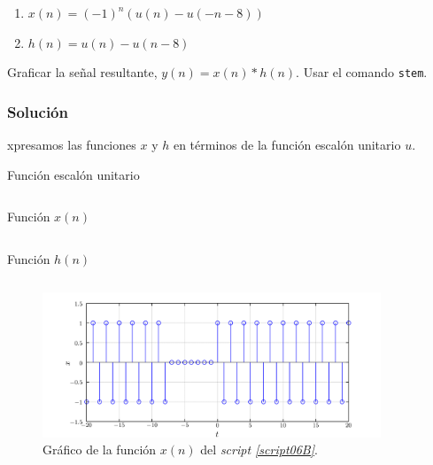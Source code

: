 \documentclass[a4paper,12pt,final]{article}
\begin{document}
    \begin{enumerate}
        \item $x\left(n\right) = \left(-1\right)^n \left(u\left(n\right) - u\left(-n-8\right)\right)$
        \item $h\left(n\right) = u\left(n\right) - u\left(n-8\right)$
    \end{enumerate}

    \noindent Graficar la señal resultante, $y\left(n\right) = x\left(n\right) * h\left(n\right)$.
    Usar el comando \texttt{stem}.

    \subsubsection*{Solución}
      \noindent xpresamos las funciones $x$ y $h$ en términos de la función escalón unitario $u$.

      \begin{listing}[H]
        \caption{Función escalón unitario}
        \label{script06A}
        \inputminted{matlab}{./laboratorio_3/escalon.m}
      \end{listing}

      \begin{listing}[H]
        \caption{Función $x\left(n\right)$}
        \label{script06B}
        \inputminted{matlab}{./laboratorio_3/p6_X.m}
      \end{listing}

      \begin{listing}[H]
        \caption{Función $h\left(n\right)$}
        \label{script06C}
        \inputminted{matlab}{./laboratorio_3/p6_H.m}
      \end{listing}

    \begin{figure}[H]
      \begin{center}
        \caption{Gráfico de la función $x\left(n\right)$ del \emph{script \ref{script06B}}.}
        \includegraphics[width=0.90\textwidth]{./laboratorio_3/problema06_X.png}
      \end{center}
    \end{figure}
\end{document}
